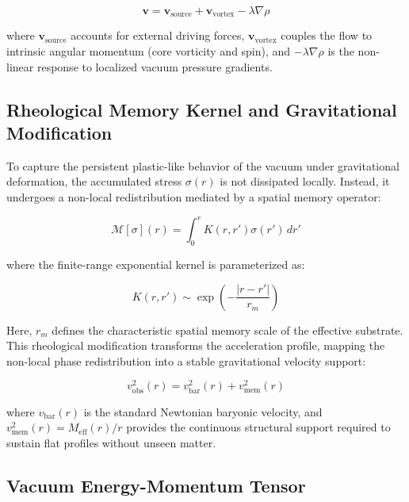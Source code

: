 \documentclass[prd,
               reprint,
               aps,
               preprintnumbers,
               nofootinbib,
               longbibliography,
               floatfix]{revtex4-2}
\begin{document}
\begin{equation}
\mathbf{v} = \mathbf{v}_{\text{source}} +
\mathbf{v}_{\text{vortex}} - \lambda \nabla \rho
\end{equation}

where $\mathbf{v}_{\text{source}}$ accounts for external driving forces,
$\mathbf{v}_{\text{vortex}}$ couples the flow to intrinsic angular
momentum (core vorticity and spin), and $-\lambda \nabla \rho$ is the
non-linear response to localized vacuum pressure gradients.

\subsection{Rheological Memory Kernel and Gravitational Modification}
To capture the persistent plastic-like behavior of the vacuum under
gravitational deformation, the accumulated stress $\sigma(r)$ is not
dissipated locally. Instead, it undergoes a non-local redistribution
mediated by a spatial memory operator:

\begin{equation}
\mathcal{M}[\sigma](r) = \int_{0}^{r} K(r, r') \sigma(r') \, dr'
\end{equation}

where the finite-range exponential kernel is parameterized as:

\begin{equation}
K(r, r') \sim \exp\left( -\frac{|r - r'|}{r_m} \right)
\end{equation}

Here, $r_m$ defines the characteristic spatial memory scale of the
effective substrate. This rheological modification transforms the
acceleration profile, mapping the non-local phase redistribution into a
stable gravitational velocity support:

\begin{equation}
v_{\text{obs}}^2(r) = v_{\text{bar}}^2(r) + v_{\text{mem}}^2(r)
\end{equation}

where $v_{\text{bar}}(r)$ is the standard Newtonian baryonic velocity,
and $v_{\text{mem}}^2(r) = M_{\text{eff}}(r)/r$ provides the continuous
structural support required to sustain flat profiles without unseen
matter.


\subsection{Vacuum Energy-Momentum Tensor}
\end{document}
